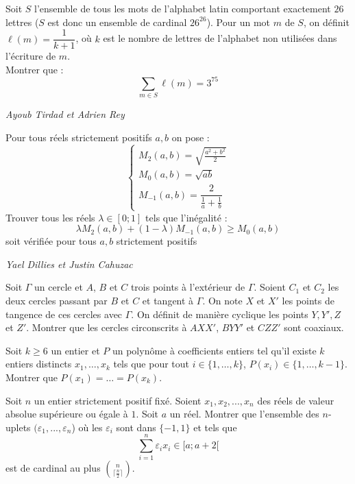 \begin{exo}{}
Soit $S$ l'ensemble de tous les mots de l'alphabet latin comportant exactement $26$ lettres ($S$ est donc un ensemble de cardinal $26^{26}$). Pour un mot $m$ de $S$, on définit $\ell(m) = \dfrac{1}{k+1}$, où $k$ est le nombre de lettres de l'alphabet non utilisées dans l'écriture de $m$. \\
Montrer que :
\[ \displaystyle \sum_{m \in S} \ell(m) = 3^{75} \]

\medskip
\textit{Ayoub Tirdad et Adrien Rey}
\end{exo}

\begin{exo}{}
Pour tous réels strictement positifs $a,b$ on pose :
$$\begin{cases} M_2(a,b)=\sqrt{\frac{a^2+b^2}{2}}\\M_0(a,b)=\sqrt{ab}\\M_{-1}(a,b)=\dfrac{2}{\frac{1}{a}+\frac{1}{b}}\end{cases}$$
Trouver tous les réels $\lambda\in [0;1]$ tels que l'inégalité :
$$\lambda M_2(a,b)+(1-\lambda)M_{-1}(a,b)\ge M_0(a,b)$$
soit vérifiée pour tous $a,b$ strictement positifs

\medskip
\textit{Yael Dillies et Justin Cahuzac}
\end{exo}




\begin{exo}{}
Soit $\Gamma$ un cercle et $A$, $B$ et $C$ trois points à l'extérieur de $\Gamma$. Soient $C_1$ et $C_2$ les deux cercles passant par $B$ et $C$ et tangent à $\Gamma$. On note $X$ et $X'$ les points de tangence de ces cercles avec $\Gamma$. On définit de manière cyclique les points $Y,Y',Z$ et $Z'$. Montrer que les cercles circonscrits à $AXX'$, $BYY'$ et $CZZ'$ sont coaxiaux.
\end{exo}




\begin{exo}{} Soit $k\geq 6$ un entier et $P$ un polynôme à coefficients entiers tel qu'il existe $k$ entiers distincts $x_1,\ldots,x_k$ tels que pour tout $i\in \{1,\ldots,k\}$, $P(x_i) \in \{1,\ldots,k-1\}$. Montrer que $P(x_1) = \ldots = P(x_k)$.
\end{exo}

\begin{exo}{}
Soit $n$ un entier strictement positif fixé. Soient $x_1, x_2,..., x_n$ des réels de valeur
absolue supérieure ou égale à $1$. Soit $a$ un réel. Montrer que l’ensemble des $n$-uplets $(\varepsilon_1,...,\varepsilon_n$)
où les $\varepsilon_i$ sont dans $\{-1,1\}$ et tels que
$$\sum\limits_{i=1}^n \varepsilon_i x_i \in [a;a+2[$$
est de cardinal au plus $\binom{n}{\lceil \frac{n}{2}\rceil}$.
\end{exo}

